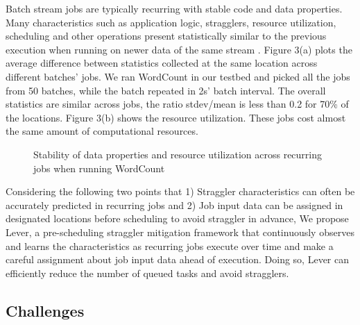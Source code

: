   Batch stream jobs are typically recurring with stable code and data properties. Many characteristics such as application logic, stragglers, resource utilization, scheduling and other operations present statistically similar to the previous execution when running on newer data of the same stream \cite{Agarwal}. Figure 3(a) plots the average difference between statistics collected at the same location across different batches' jobs. We ran WordCount in our testbed and picked all the jobs from 50 batches, while the batch repeated in 2s' batch interval. The overall statistics are similar across jobs, the ratio stdev/mean is less than 0.2 for 70\% of the locations. Figure 3(b) shows the resource utilization. These jobs cost almost the same amount of computational resources.
  \begin{figure}[htbp]
    \centering
    \caption{Stability of data properties and resource utilization across recurring jobs when running WordCount}
    \label{Fig. 3:}
  \end{figure}

  Considering the following two points that 1) Straggler characteristics can often be accurately predicted in recurring jobs and 2) Job input data can be assigned in designated locations before scheduling to avoid straggler in advance, We propose Lever, a pre-scheduling straggler mitigation framework that continuously observes and learns the characteristics as recurring jobs execute over time and make a careful assignment about job input data ahead of execution. Doing so, Lever can efficiently reduce the number of queued tasks and avoid stragglers.

\subsection{Challenges}

